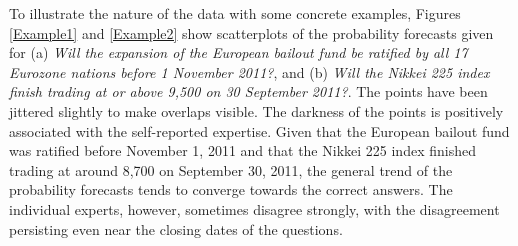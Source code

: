 \documentclass[aoas, preprint]{imsart}
\numberwithin{equation}{section}
\theoremstyle{plain}
\begin{document}
To illustrate the nature of the data with some concrete examples, Figures \ref{Example1} and \ref{Example2} show scatterplots of the probability forecasts given for (a) \textit{Will the expansion of the European bailout fund be ratified by all 17 Eurozone nations before 1 November 2011?}, and (b) \textit{Will the Nikkei 225 index finish trading at or above 9,500 on 30 September 2011?}. The points have been jittered slightly to make overlaps visible. The darkness of the points is positively associated with the self-reported expertise. Given that the European bailout fund was ratified before November 1, 2011 and that the Nikkei 225 index finished trading at around 8,700 on September 30, 2011, the general trend of the probability forecasts tends to converge towards the correct answers. The individual experts, however, sometimes disagree strongly, with the disagreement persisting even near the closing dates of the questions. 
\end{document}
